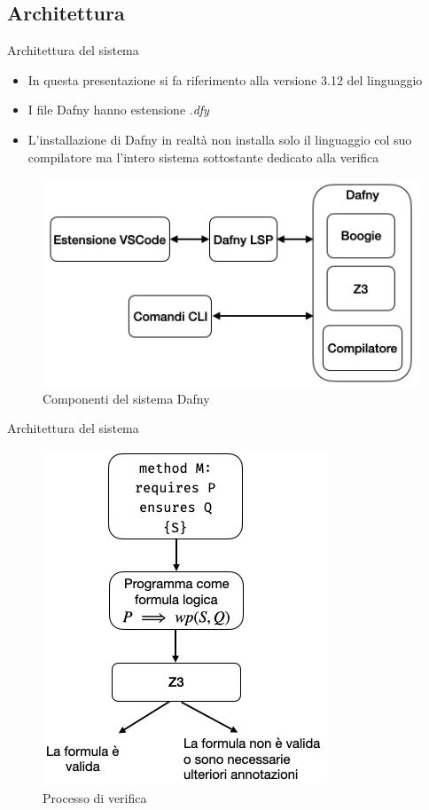\documentclass[]{beamer}
\begin{document}
\subsection{Architettura}
\begin{frame}{Architettura del sistema}
\begin{itemize}
    \item In questa presentazione si fa riferimento alla versione 3.12 del linguaggio
    \item I file Dafny hanno estensione .\textit{dfy}
    \item L'installazione di Dafny in realtà non installa solo il linguaggio col suo compilatore ma l'intero sistema sottostante dedicato alla verifica
\end{itemize}
\begin{figure}
    \centering
    \includegraphics[scale=0.5]{assets/img/Dafny_schema.png}
    \caption{Componenti del sistema Dafny}
\end{figure}
\end{frame}

\begin{frame}{Architettura del sistema}
\begin{figure}
    \centering
    \includegraphics[scale=0.5]{assets/img/verification_schema.png}
    \caption{Processo di verifica}
\end{figure}
\end{frame}
\end{document}
